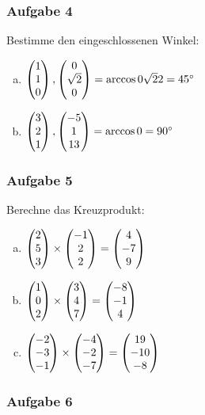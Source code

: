	\subsubsection{Aufgabe 4}
	
		Bestimme den eingeschlossenen Winkel:
		
			\begin{enumerate}[a)]
				\item $\mvect{1\\1\\0},\mvect{0\\\sqrt{2}\\0} = \arccos{\frac{\sqrt{2}}{2}} = 45^\circ$
			    \item $\mvect{3\\2\\1},\mvect{-5\\1\\13} = \arccos{0} = 90^\circ$
			\end{enumerate}
	
	\subsubsection{Aufgabe 5}
		
		Berechne das Kreuzprodukt:
				
			\begin{enumerate}[a)]
			    \item $\mvect{2\\5\\3} \times \mvect{-1\\2\\2} = \mvect{4\\-7\\9}$
				\item $\mvect{1\\0\\2} \times \mvect{3\\4\\7} = \mvect{-8\\-1\\4}$
			    \item $\mvect{-2\\-3\\-1} \times \mvect{-4\\-2\\-7} = \mvect{19\\-10\\-8}$
			\end{enumerate}
		
	\subsubsection{Aufgabe 6}
		

